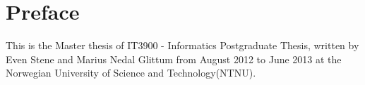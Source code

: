 \chapter*{Preface}
This is the Master thesis of IT3900 - Informatics Postgraduate Thesis, written by Even Stene and Marius Nedal Glittum from August 2012 to June 2013 at the Norwegian University of Science and Technology(NTNU).